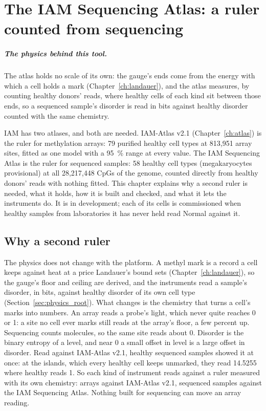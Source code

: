 \chapter{The IAM Sequencing Atlas: a ruler counted from sequencing}\label{ch:seqatlas}

\paragraph{The physics behind this tool.} The atlas holds no scale of its own: the gauge's ends come from the energy with which a cell holds a mark (Chapter~\ref{ch:landauer}), and the atlas measures, by counting healthy donors' reads, where healthy cells of each kind sit between those ends, so a sequenced sample's disorder is read in bits against healthy disorder counted with the same chemistry.

IAM has two atlases, and both are needed. IAM-Atlas v2.1 (Chapter~\ref{ch:atlas}) is the ruler for methylation arrays: 79 purified healthy cell types at 813,951 array sites, fitted as one model with a 95~\% range at every value. The IAM Sequencing Atlas is the ruler for sequenced samples: 58 healthy cell types (megakaryocytes provisional) at all 28,217,448 CpGs of the genome, counted directly from healthy donors' reads with nothing fitted. This chapter explains why a second ruler is needed, what it holds, how it is built and checked, and what it lets the instruments do. It is in development; each of its cells is commissioned when healthy samples from laboratories it has never held read Normal against it.

\section{Why a second ruler}

The physics does not change with the platform. A methyl mark is a record a cell keeps against heat at a price Landauer's bound sets (Chapter~\ref{ch:landauer}), so the gauge's floor and ceiling are derived, and the instruments read a sample's disorder, in bits, against healthy disorder of its own cell type (Section~\ref{sec:physics_root}). What changes is the chemistry that turns a cell's marks into numbers. An array reads a probe's light, which never quite reaches 0 or 1: a site no cell ever marks still reads at the array's floor, a few percent up. Sequencing counts molecules, so the same site reads about 0. Disorder is the binary entropy of a level, and near 0 a small offset in level is a large offset in disorder. Read against IAM-Atlas v2.1, healthy sequenced samples showed it at once: at the islands, which every healthy cell keeps unmarked, they read 14.5255 where healthy reads 1. So each kind of instrument reads against a ruler measured with its own chemistry: arrays against IAM-Atlas v2.1, sequenced samples against the IAM Sequencing Atlas. Nothing built for sequencing can move an array reading.

